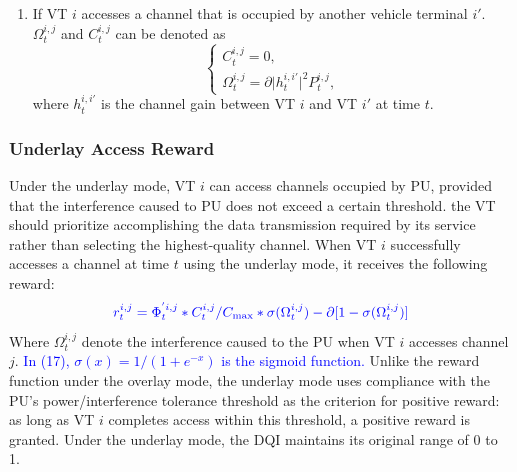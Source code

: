 \documentclass[journal]{IEEEtran}
\newcommand{\revise}[1]{\textcolor{blue}{#1}}
\begin{document}
\begin{enumerate}
\item If VT $i$ accesses a channel that is occupied by another vehicle terminal $i'$. $\Omega _t^{i,j}$ and $C_t^{i,j}$ can be denoted as 	
\begin{equation}
		\left\{ \begin{array}{l}
C_t^{i,j} = 0,\\
\Omega _t^{i,j} = \partial |h_t^{i,i'}{|^2}P_t^{i,j},
\end{array} \right.
\end{equation}
 where $h_t^{i,i'}$ is the channel gain between VT $i$ and VT $i'$ at time $t$.
\end{enumerate}

\subsubsection{Underlay Access Reward}
Under the underlay mode, VT $i$ can access channels occupied by PU, 
provided that the interference caused to PU does not exceed a certain threshold. 
the VT should prioritize accomplishing the data transmission required by its service rather than selecting the highest‑quality channel.
When VT $i$ successfully accesses a channel at time $t$ using the underlay mode, it receives the following reward:
\begin{equation}
\label{eq:reward_unified}
{\color{blue}
r_t^{i,j} = \Phi_t^{'i,j} * C_t^{i,j}/C_{\max} * \sigma(\Omega_t^{i,j}) - \partial[1 - \sigma(\Omega_t^{i,j})]
}
\end{equation}
Where $\Omega_t^{i,j}$ denote the interference caused to the PU when VT $i$ accesses channel $j$. \revise{In (17), $\sigma(x) = 1/(1 + e^{-x})$ is the sigmoid function.} Unlike the reward function under the overlay mode, the underlay mode uses compliance with the PU’s power/interference tolerance threshold
 as the criterion for positive reward: as long as VT $i$ completes access within this threshold, a positive reward is granted. 
 Under the underlay mode, the DQI maintains its original range of 0 to 1.
\end{document}
